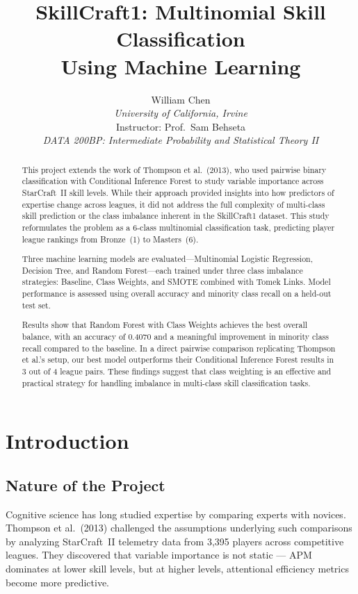 \documentclass[12pt, a4paper]{article}
\title{
    \vspace{-1cm}
    \Large\textbf{SkillCraft1: Multinomial Skill Classification\\Using Machine Learning}
}
\author{
    William Chen\\
    \textit{University of California, Irvine}\\
    Instructor: Prof.\ Sam Behseta\\
    \textit{DATA 200BP: Intermediate Probability and Statistical Theory II}
}
\date{}
\begin{document}
\maketitle
\thispagestyle{empty}

\begin{abstract}
This project extends the work of Thompson et al.\ (2013), who used pairwise binary
classification with Conditional Inference Forest to study variable importance across
StarCraft~II skill levels. While their approach provided insights into how predictors
of expertise change across leagues, it did not address the full complexity of multi-class
skill prediction or the class imbalance inherent in the SkillCraft1 dataset. This study
reformulates the problem as a 6-class multinomial classification task, predicting player
league rankings from Bronze~(1) to Masters~(6).

Three machine learning models are evaluated---Multinomial Logistic Regression,
Decision Tree, and Random Forest---each trained under three class imbalance strategies:
Baseline, Class Weights, and SMOTE combined with Tomek Links. Model performance is
assessed using overall accuracy and minority class recall on a held-out test set.

Results show that Random Forest with Class Weights achieves the best overall balance,
with an accuracy of 0.4070 and a meaningful improvement in minority class recall
compared to the baseline. In a direct pairwise comparison replicating Thompson et al.'s
setup, our best model outperforms their Conditional Inference Forest results in 3 out
of 4 league pairs. These findings suggest that class weighting is an effective and
practical strategy for handling imbalance in multi-class skill classification tasks.
\end{abstract}

\newpage
\tableofcontents
\newpage

\section{Introduction}

\subsection{Nature of the Project}

Cognitive science has long studied expertise by comparing experts with novices. Thompson
et al.\ (2013) challenged the assumptions underlying such comparisons by analyzing
StarCraft~II telemetry data from 3,395 players across competitive leagues. They discovered
that variable importance is not static --- APM dominates at lower skill levels, but at
higher levels, attentional efficiency metrics become more predictive.
\end{document}
